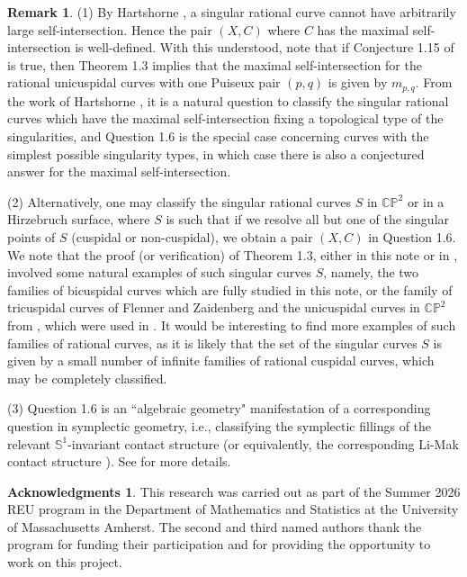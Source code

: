 \documentclass[11pt]{amsart}
\theoremstyle{plain}
\numberwithin{theorem}{section}
\theoremstyle{definition}
\newtheorem{remark}[theorem]{Remark}
\newtheorem{acknowledgments}{Acknowledgments\ignorespaces}
\newcommand{\C}{{\mathbb C}}
\renewcommand{\P}{{\mathbb P}}
\newcommand{\s}{{\mathbb S}}
\begin{document}
\begin{remark}
(1) By Hartshorne \cite{Hartsh}, a singular rational curve cannot have arbitrarily large self-intersection. Hence the pair $(X,C)$ where $C$ has the maximal self-intersection is well-defined. With this understood, note that if Conjecture 1.15 of \cite{C} is true, then Theorem 1.3 implies that the maximal self-intersection for the rational unicuspidal curves with one Puiseux pair $(p,q)$ is given by $m_{p,q}$. 
From the work of Hartshorne \cite{Hartsh}, it is a natural question to classify the singular rational curves
which have the maximal self-intersection fixing a topological type of the singularities, and Question 1.6 is the special case concerning curves with the simplest possible singularity types, in which case there is also a conjectured answer for the maximal self-intersection. 

(2) Alternatively, one may classify the singular rational curves $S$ in $\C\P^2$ or in a Hirzebruch surface, where $S$ is such that if we resolve all but one of the singular points of $S$ (cuspidal or non-cuspidal), we obtain a pair $(X,C)$ in Question 1.6. We note that the proof (or verification) of Theorem 1.3, either in this note or in \cite{C}, involved some natural examples of such singular curves $S$, namely,  the two families of bicuspidal curves which are fully studied in this note, or the family of tricuspidal curves of Flenner and Zaidenberg \cite{FZ} and the unicuspidal curves in $\C\P^2$ from \cite{F}, which were used in \cite{C}. It would be interesting to find more examples of such families of rational curves, as it is likely that the set of the singular curves $S$ is given by a small number of infinite families of rational cuspidal curves, which may be completely classified. 

(3) Question 1.6 is an ``algebraic geometry" manifestation of a corresponding question in symplectic geometry, i.e., classifying the symplectic fillings of the relevant $\s^1$-invariant contact structure (or equivalently, the corresponding Li-Mak contact structure \cite{LM}). See \cite{C} for more details. 
\end{remark}

\begin{acknowledgments}
This research was carried out as part of the Summer 2026 REU program in the Department of Mathematics and Statistics at the University of Massachusetts Amherst. The second and third named authors thank the program for funding their participation and for providing the opportunity to work on this project.
\end{acknowledgments}
\end{document}

